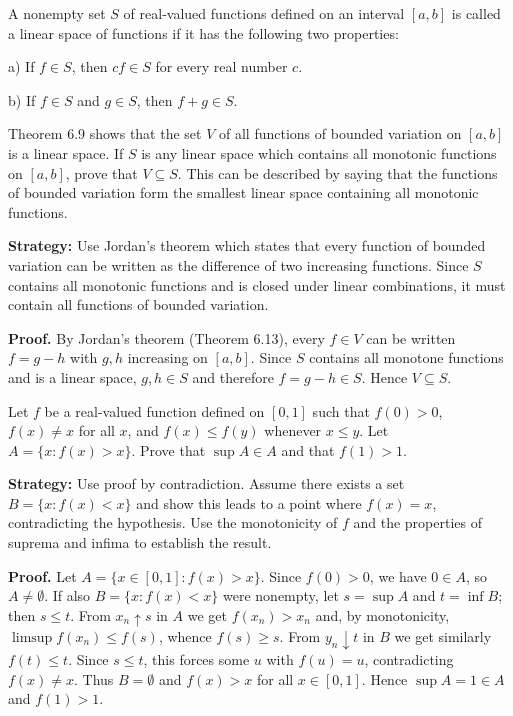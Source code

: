 \begin{problembox}
A nonempty set $S$ of real-valued functions defined on an interval $[a, b]$ is called a linear space of functions if it has the following two properties:

a) If $f \in S$, then $cf \in S$ for every real number $c$.

b) If $f \in S$ and $g \in S$, then $f + g \in S$.

Theorem 6.9 shows that the set $V$ of all functions of bounded variation on $[a, b]$ is a linear space. If $S$ is any linear space which contains all monotonic functions on $[a, b]$, prove that $V \subseteq S$. This can be described by saying that the functions of bounded variation form the smallest linear space containing all monotonic functions.
\end{problembox}

\noindent\textbf{Strategy:} Use Jordan's theorem which states that every function of bounded variation can be written as the difference of two increasing functions. Since $S$ contains all monotonic functions and is closed under linear combinations, it must contain all functions of bounded variation.

\noindent\textbf{Proof.}
By Jordan’s theorem (Theorem 6.13), every $f\in V$ can be written $f=g-h$ with $g,h$ increasing on $[a,b]$. Since $S$ contains all monotone functions and is a linear space, $g,h\in S$ and therefore $f=g-h\in S$. Hence $V\subseteq S$.



\begin{problembox}
Let $f$ be a real-valued function defined on $[0, 1]$ such that $f(0) > 0$, $f(x) \neq x$ for all $x$, and $f(x) \leq f(y)$ whenever $x \leq y$. Let $A = \{x: f(x) > x\}$. Prove that $\sup A \in A$ and that $f(1) > 1$.
\end{problembox}

\noindent\textbf{Strategy:} Use proof by contradiction. Assume there exists a set $B = \{x: f(x) < x\}$ and show this leads to a point where $f(x) = x$, contradicting the hypothesis. Use the monotonicity of $f$ and the properties of suprema and infima to establish the result.

\noindent\textbf{Proof.}
Let $A=\{x\in[0,1]: f(x)>x\}$. Since $f(0)>0$, we have $0\in A$, so $A\neq\emptyset$. If also $B=\{x: f(x)<x\}$ were nonempty, let $s=\sup A$ and $t=\inf B$; then $s\le t$. From $x_n\uparrow s$ in $A$ we get $f(x_n)>x_n$ and, by monotonicity, $\limsup f(x_n)\le f(s)$, whence $f(s)\ge s$. From $y_n\downarrow t$ in $B$ we get similarly $f(t)\le t$. Since $s\le t$, this forces some $u$ with $f(u)=u$, contradicting $f(x)\ne x$. Thus $B=\emptyset$ and $f(x)>x$ for all $x\in[0,1]$. Hence $\sup A=1\in A$ and $f(1)>1$.




